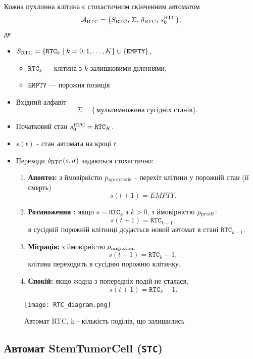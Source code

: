\documentclass[12pt]{article}
\begin{document}
Кожна пухлинна клітина є стохастичним скінченним автоматом
\[
\mathcal{A}_{\rm RTC} = \bigl(S_{\rm RTC},\,\Sigma,\,\delta_{\rm RTC},\,s_0^{\rm RTC}\bigr),
\]
де
\begin{itemize}
  \item $S_{\rm RTC} = \{\mathtt{RTC}_k \mid k=0,1,\dots,K\}\cup\{\mathtt{EMPTY}\}$,  
    \begin{itemize}
      \item $\mathtt{RTC}_k$ — клітина з $k$ залишковими діленнями,
      \item $\mathtt{EMPTY}$ — порожня позиція
    \end{itemize}
  \item Вхідний алфавіт 
    \[
      \Sigma = \bigl\{\,\text{мультимножина сусідніх станів}\bigr\}.
    \]
  \item Початковий стан $s_0^{\rm RTC} = \mathtt{RTC}_{K}$.
  \item $s(t)$ - стан автомата на кроці $t$ 
  \item Переходи $\delta_{\rm RTC}(s,\sigma)$ задаються стохастично:
    \begin{enumerate}
      \item {\bfseries Апоптоз:}  
      з ймовірністю $p_{\rm apoptosis}$ - перехіт клітини у порожній стан (її смерть)
      \[
        s(t+1) = EMPTY.
      \]
      \item {\bfseries Розмноження :}  
      якщо $s=\mathtt{RTC}_k$ з $k>0$, з ймовірністю $p_{\rm prolif}$:
      \[
        s(t+1)=\mathtt{RTC}_{k-1},
      \] в сусідній порожній клітинці додається новий автомат в стані $\mathtt{RTC}_{k-1}$.
      \item {\bfseries Міграція:}  
      з ймовірністю $p_{\rm migration}$  
      \[
        s(t+1)=\mathtt{RTC}_k-1,
      \] клітина переходить в сусідню порожню клітинку.
      \item {\bfseries Спокій:}  
      якщо жодна з попередніх подій не сталася,  
      \[
        s(t+1)=\mathtt{RTC}_k-1.
      \]
    \end{enumerate}
\end{itemize}
\begin{figure}[h] %
    \centering
    \texttt{[image: RTC\_diagram.png]} %
    \caption{Автомат RTC, k - кількість поділів, що залишились}
    \label{fig:example}
\end{figure}

\subsection{Автомат StemTumorCell (\texttt{STC})}
\end{document}

